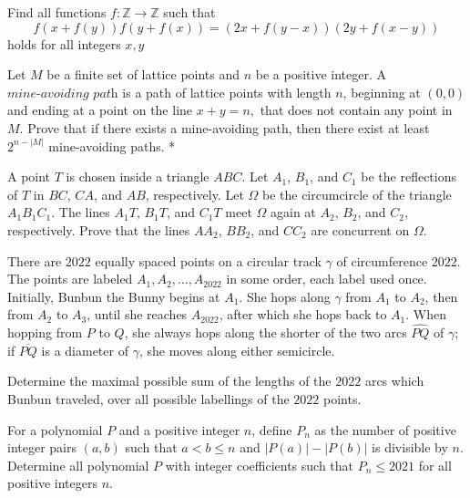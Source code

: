 \documentclass[11pt]{scrartcl}
\begin{document}
\begin{problem}[2828356184930533677]
Find all functions $ f: \mathbb{Z} \to \mathbb{Z} $ such that$$ f\left(x+f\left(y\right)\right)f\left(y+f\left(x\right)\right)=\left(2x+f\left(y-x\right)\right)\left(2y+f\left(x-y\right)\right) $$holds for all integers $ x,y $
\end{problem}
\begin{problem}[2886276736199315342]
	Let $M$ be a finite set of lattice points and $n$ be a positive integer. A $\textit{mine-avoiding path}$ is a path of lattice points with length $n$, beginning at $(0,0)$ and ending at a point on the line $x+y=n,$ that does not contain any point in $M$. Prove that if there exists a mine-avoiding path, then there exist at least $2^{n-|M|}$ mine-avoiding paths. *
\end{problem}
\begin{problem}[2918584823978789760]
A point $T$ is chosen inside a triangle $ABC$. Let $A_1$, $B_1$, and $C_1$ be the reflections of $T$ in $BC$, $CA$, and $AB$, respectively. Let $\Omega$ be the circumcircle of the triangle $A_1B_1C_1$. The lines $A_1T$, $B_1T$, and $C_1T$ meet $\Omega$ again at $A_2$, $B_2$, and $C_2$, respectively. Prove that the lines $AA_2$, $BB_2$, and $CC_2$ are concurrent on $\Omega$.
\end{problem}
\begin{problem}[2974998787723554962]
	There are $2022$ equally spaced points on a circular track $\gamma$ of circumference $2022$. The points are labeled $A_1, A_2, \ldots, A_{2022}$ in some order, each label used once. Initially, Bunbun the Bunny begins at $A_1$. She hops along $\gamma$ from $A_1$ to $A_2$, then from $A_2$ to $A_3$, until she reaches $A_{2022}$, after which she hops back to $A_1$. When hopping from $P$ to $Q$, she always hops along the shorter of the two arcs $\widehat{PQ}$ of $\gamma$; if $\overline{PQ}$ is a diameter of $\gamma$, she moves along either semicircle.

Determine the maximal possible sum of the lengths of the $2022$ arcs which Bunbun traveled, over all possible labellings of the $2022$ points.
\end{problem}
\begin{problem}[2988718857225198152]
	For a polynomial $P$ and a positive integer $n$, define $P_n$ as the number of positive integer pairs $(a,b)$ such that $a<b \leq n$ and $|P(a)|-|P(b)|$ is divisible by $n$. Determine all polynomial $P$ with integer coefficients such that $P_n \leq 2021$ for all positive integers $n$.
\end{problem}
\end{document}
